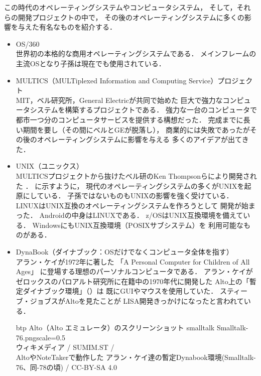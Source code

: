 この時代のオペレーティングシステムやコンピュータシステム，
そして，それらの開発プロジェクトの中で，
その後のオペレーティングシステムに多くの影響を与えた有名なものを紹介する．

\begin{itemize}
\item OS/360 \\
世界初の本格的な商用オペレーティングシステムである．
メインフレームの主流OSとなり子孫は現在でも使用されている\cite{os360}．

\item MULTICS（MULTiplexed Information and Computing Service）プロジェクト
\cite{third} \\
MIT，ベル研究所，General Electricが共同で始めた
巨大で強力なコンピュータシステムを構築するプロジェクトである．
強力な一台のコンピュータで
都市一つ分のコンピュータサービスを提供する構想だった．
完成までに長い期間を要し（その間にベルとGEが脱落し），
商業的には失敗であったがその後のオペレーティングシステムに影響を与える
多くのアイデアが出てきた．

\item UNIX（ユニックス） \\
MULTICSプロジェクトから抜けたベル研のKen Thompsonらにより開発された
\cite{unix}．
に示すように，
現代のオペレーティングシステムの多くがUNIXを起原にしている．
子孫ではないものもUNIXの影響を強く受けている．
LINUXはUNIX互換のオペレーティングシステムを作ろうとして
開発が始まった\cite{linux}．
Androidの中身はLINUXである\cite{android}．
z/OSはUNIX互換環境を備えている\cite{zos}．
WindowsにもUNIX互換環境（POSIXサブシステム）を
利用可能なものがある\cite{windows}．

\item DynaBook（ダイナブック：OSだけでなくコンピュータ全体を指す）
\cite{dynabook2} \\
アラン・ケイが1972年に著した
「A Personal Computer for Children of All Ages」\cite{key72, key72J}
に登場する理想のパーソナルコンピュータである．
アラン・ケイがゼロックスのパロアルト研究所に在籍中の1970年代に開発した
Alto上の「暫定ダイナブック環境」（）は
既にGUIやマウスを使用していた．
スティーブ・ジョブスがAltoを見たことが
LISA開発きっかけになったと言われている\cite{dynabook}．

\begin{myfig}{btp}
{Alto（Alto エミュレータ）のスクリーンショット}
{smalltalk}
\myincludegraphics
{Smalltalk-76.png}{scale=0.5}\\
{\small
ウィキメディア /
SUMIM.ST /\\
AltoやNoteTakerで動作した
アラン・ケイ達の暫定Dynabook環境(Smalltalk-76、同-78の頃) /
CC-BY-SA 4.0
}
\end{myfig}

\end{itemize}

